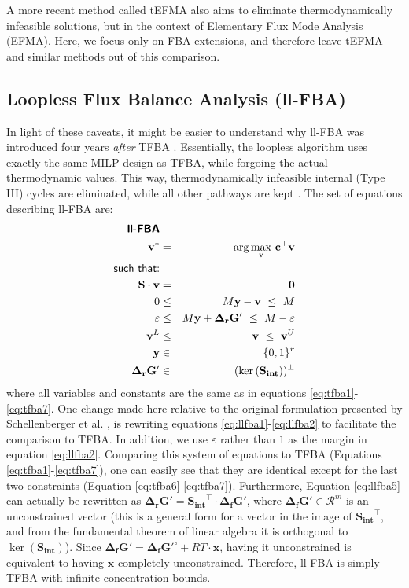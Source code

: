 \documentclass[twocolumn]{article}
\begin{document}
A more recent method called tEFMA \cite{Gerstl2015a, Gerstl2015} also aims to eliminate thermodynamically infeasible solutions, but in the context of Elementary Flux Mode Analysis (EFMA). Here, we focus only on FBA extensions, and therefore leave tEFMA and similar methods out of this comparison.

\subsection{Loopless Flux Balance Analysis (ll-FBA)}
In light of these caveats, it might be easier to understand why ll-FBA was introduced four years \emph{after} TFBA \cite{Schellenberger2011-bq}. Essentially, the loopless algorithm uses exactly the same MILP design as TFBA, while forgoing the actual thermodynamic values. This way, thermodynamically infeasible internal (Type III) cycles are eliminated, while all other pathways are kept \cite{Noor2012-qb}. The set of equations describing ll-FBA are:
\begin{eqnarray}
\textsf{\textbf{ll-FBA}} && \nonumber\\
\mathbf{v^*} &=& \mathrm{arg\max_v} {~\mathbf{c}^\top\mathbf{v}}\nonumber\\
\textsf{such that:} && \nonumber\\
\mathbf{S} \cdot \mathbf{v} &=& \mathbf{0} \label{eq:llfba1} \\
0 &\leq& M \mathbf{y} - \mathbf{v} ~\leq~ M
\label{eq:llfba2} \\
\varepsilon &\leq& M \mathbf{y} + \mathbf{\Delta_r G'} ~\leq~ M - \varepsilon \label{eq:llfba3} \\
\mathbf{v}^L &\leq& \mathbf{v} ~\leq~ \mathbf{v}^U \\
\mathbf{y} &\in& \{0, 1\}^r \label{eq:llfba4} \\
\mathbf{\Delta_r G'} &\in& (\ker{(\mathbf{S_{int}})})^\perp \label{eq:llfba5}
\end{eqnarray}
where all variables and constants are the same as in equations \ref{eq:tfba1}-\ref{eq:tfba7}. One change made here relative to the original formulation presented by Schellenberger et al. \cite{Schellenberger2011-bq}, is rewriting equations \ref{eq:llfba1}-\ref{eq:llfba2} to facilitate the comparison to TFBA. In addition, we use $\varepsilon$ rather than $1$ as the margin in equation \ref{eq:llfba2}.
Comparing this system of equations to TFBA (Equations \ref{eq:tfba1}-\ref{eq:tfba7}), one can easily see that they are identical except for the last two constraints (Equation \ref{eq:tfba6}-\ref{eq:tfba7}). Furthermore, Equation \ref{eq:llfba5} can actually be rewritten as $\mathbf{\Delta_r G'} = \mathbf{S_{int}}^\top \cdot \mathbf{\Delta_f G'}$, where $\mathbf{\Delta_f G'} \in \mathcal{R}^{m}$ is an unconstrained vector (this is a general form for a vector in the image of $\mathbf{S_{int}}^\top$, and from the fundamental theorem of linear algebra it is orthogonal to $\ker{(\mathbf{S_{int}})}$). Since $\mathbf{\Delta_f G'} = \mathbf{\Delta_f G'^\circ} + RT \cdot \mathbf{x}$, having it unconstrained is equivalent to having $\mathbf{x}$ completely unconstrained. Therefore, ll-FBA is simply TFBA with infinite concentration bounds.
\end{document}
